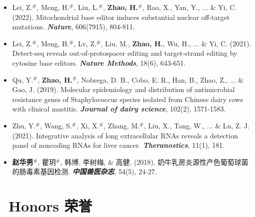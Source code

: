 \documentclass{resume}
\begin{document}
	\begin{itemize}
		\item Lei, Z.$^\#$, Meng, H.$^\#$, Liu, L.$^\#$, \textbf{Zhao, H.}$^\#$, Rao, X., Yan, Y., ... \& Yi, C.
			(2022). 
			Mitochondrial base editor induces substantial nuclear off-target mutations. 
			\textit{ \textbf{Nature}}, 606(7915), 804-811.
		\item Lei, Z.$^\#$, Meng, H.$^\#$, Lv, Z.$^\#$, Liu, M., \textbf{Zhao, H.}, Wu, H., ... \& Yi, C. 
			(2021).
			Detect-seq reveals out-of-protospacer editing and target-strand editing by cytosine base editors. 
			\textit{ \textbf{Nature Methods}}, 18(6), 643-651.
	  	\item Qu, Y.$^\#$, \textbf{Zhao, H.}$^\#$, Nobrega, D. B., Cobo, E. R., Han, B., Zhao, Z., ... \& Gao, J. 
			(2019). 
			Molecular epidemiology and distribution of antimicrobial resistance genes of Staphylococcus species isolated from Chinese dairy cows with clinical mastitis. 
			\textit{ \textbf{Journal of dairy science}}, 102(2), 1571-1583.
		\item Zhu, Y.$^\#$, Wang, S.$^\#$, Xi, X.$^\#$, Zhang, M.$^\#$, Liu, X., Tang, W., ... \& Lu, Z. J. 
			(2021). 
			Integrative analysis of long extracellular RNAs reveals a detection panel of noncoding RNAs for liver cancer. 
			\textit{ \textbf{Theranostics}}, 11(1), 181.
	  
	  	\item \textbf{赵华男}$^\#$, 瞿玥$^\#$, 韩博, 李树梅, \& 高健. 
			(2018). 
			奶牛乳房炎源性产色葡萄球菌的肠毒素基因检测. 
			\textit{ \textbf{中国兽医杂志}}, 54(5), 24-27.
	\end{itemize}
	
	
	
	\section{\faGraduationCap\ Honors 荣誉}
	
\end{document}
